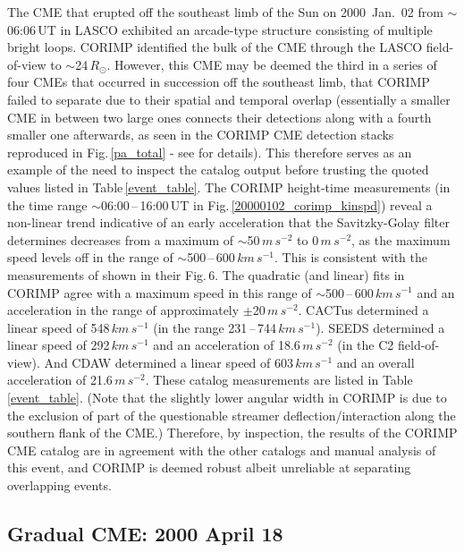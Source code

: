 \documentclass[referee,a4paper,12pt,traditabstract]{swsc}
\begin{document}
The CME that erupted off the southeast limb of the Sun on 2000~Jan.~02 from $\sim$06:06\,UT in LASCO exhibited an arcade-type structure consisting of multiple bright loops. CORIMP identified the bulk of the CME through the LASCO field-of-view to $\sim$24\,$R_\odot$. However, this CME may be deemed the third in a series of four CMEs that occurred in succession off the southeast limb, that CORIMP failed to separate due to their spatial and temporal overlap (essentially a smaller CME in between two large ones connects their detections along with a fourth smaller one afterwards, as seen in the CORIMP CME detection stacks reproduced in Fig.\,\ref{pa_total} - see \citealt{2012ApJ...752..145B} for details). This therefore serves as an example of the need to inspect the catalog output before trusting the quoted values listed in Table\,\ref{event_table}. The CORIMP height-time measurements (in the time range $\sim$06:00\,--\,16:00\,UT in Fig.\,\ref{20000102_corimp_kinspd}) reveal a non-linear trend indicative of an early acceleration that the Savitzky-Golay filter determines decreases from a maximum of $\sim$50\,$m\,s^{-2}$ to 0\,$m\,s^{-2}$, as the maximum speed levels off in the range of $\sim$500\,--\,600\,$km\,s^{-1}$. This is consistent with the measurements of \cite{2009A&A...495..325B} shown in their Fig.\,6. The quadratic (and linear) fits in CORIMP agree with a maximum speed in this range of $\sim$500\,--\,600\,$km\,s^{-1}$ and an acceleration in the range of approximately $\pm$20\,$m\,s^{-2}$. CACTus determined a linear speed of 548\,$km\,s^{-1}$ (in the range 231\,--\,744\,$km\,s^{-1}$). SEEDS determined a linear speed of 292\,$km\,s^{-1}$ and an acceleration of 18.6\,$m\,s^{-2}$ (in the C2 field-of-view). And CDAW determined a linear speed of 603\,$km\,s^{-1}$ and an overall acceleration of 21.6\,$m\,s^{-2}$. These catalog measurements are listed in Table\,\ref{event_table}. (Note that the slightly lower angular width in CORIMP is due to the exclusion of part of the questionable streamer deflection/interaction along the southern flank of the CME.) Therefore, by inspection, the results of the CORIMP CME catalog are in agreement with the other catalogs and manual analysis of this event, and CORIMP is deemed robust albeit unreliable at separating overlapping events.


\subsection{Gradual CME: 2000 April 18}
\end{document}
